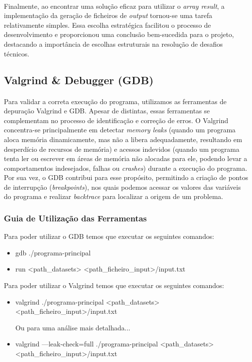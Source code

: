 \documentclass{article}
\begin{document}
\paragraph{}Finalmente, ao encontrar uma solução eficaz para utilizar o \textit{array result}, a implementação da geração de ficheiros de \textit{output} tornou-se uma tarefa relativamente simples. Essa escolha estratégica facilitou o processo de desenvolvimento e proporcionou uma conclusão bem-sucedida para o projeto, destacando a importância de escolhas estruturais na resolução de desafios técnicos.

\subsection{Valgrind & Debugger (GDB)}
\paragraph{}Para validar a correta execução do programa, utilizamos as ferramentas de depuração Valgrind e GDB. Apesar de distintas, essas ferramentas se complementam no processo de identificação e correção de erros. O Valgrind concentra-se principalmente em detectar \textit{memory leaks} (quando um programa aloca memória dinamicamente, mas não a libera adequadamente, resultando em desperdício de recursos de memória) e acessos indevidos (quando um programa tenta ler ou escrever em áreas de memória não alocadas para ele, podendo levar a comportamentos indesejados, falhas ou \textit{crashes}) durante a execução do programa. Por sua vez, o GDB contribui para esse propósito, permitindo a criação de pontos de interrupção (\textit{breakpoints}), nos quais podemos acessar os valores das variáveis do programa e realizar \textit{backtrace} para localizar a origem de um problema.

\subsubsection{Guia de Utilização das Ferramentas}
Para poder utilizar o GDB temos que executar os seguintes comandos:
\begin{itemize}
\item gdb ./programa-principal
\item run <path\_datasets> <path\_ficheiro\_input>/input.txt
\end{itemize}
Para poder utilizar o Valgrind temos que executar os seguintes comandos:
\begin{itemize}
\item valgrind ./programa-principal <path\_datasets> <path\_ficheiro\_input>/input.txt
\vspace{0.1cm}
\par Ou para uma análise mais detalhada...
\item valgrind —leak-check=full ./programa-principal <path\_datasets> <path\_ficheiro\_input>/input.txt
\end{itemize}
\end{document}
